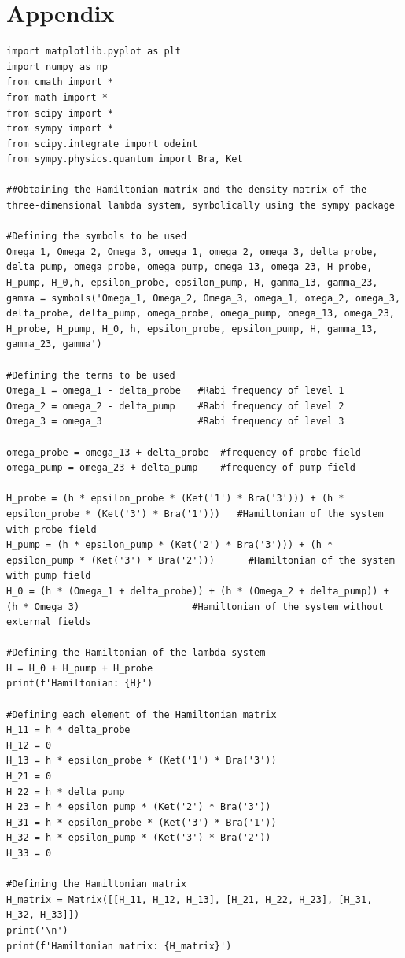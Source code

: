 \documentclass[12pt, a4paper]{article}
\begin{document}
\section{Appendix}
\begin{lstlisting}[language=iPython]
import matplotlib.pyplot as plt
import numpy as np
from cmath import *
from math import *
from scipy import *
from sympy import *
from scipy.integrate import odeint
from sympy.physics.quantum import Bra, Ket

##Obtaining the Hamiltonian matrix and the density matrix of the three-dimensional lambda system, symbolically using the sympy package

#Defining the symbols to be used
Omega_1, Omega_2, Omega_3, omega_1, omega_2, omega_3, delta_probe, delta_pump, omega_probe, omega_pump, omega_13, omega_23, H_probe, H_pump, H_0,h, epsilon_probe, epsilon_pump, H, gamma_13, gamma_23, gamma = symbols('Omega_1, Omega_2, Omega_3, omega_1, omega_2, omega_3, delta_probe, delta_pump, omega_probe, omega_pump, omega_13, omega_23, H_probe, H_pump, H_0, h, epsilon_probe, epsilon_pump, H, gamma_13, gamma_23, gamma')

#Defining the terms to be used
Omega_1 = omega_1 - delta_probe   #Rabi frequency of level 1
Omega_2 = omega_2 - delta_pump    #Rabi frequency of level 2
Omega_3 = omega_3                 #Rabi frequency of level 3

omega_probe = omega_13 + delta_probe  #frequency of probe field
omega_pump = omega_23 + delta_pump    #frequency of pump field

H_probe = (h * epsilon_probe * (Ket('1') * Bra('3'))) + (h * epsilon_probe * (Ket('3') * Bra('1')))   #Hamiltonian of the system with probe field
H_pump = (h * epsilon_pump * (Ket('2') * Bra('3'))) + (h * epsilon_pump * (Ket('3') * Bra('2')))      #Hamiltonian of the system with pump field
H_0 = (h * (Omega_1 + delta_probe)) + (h * (Omega_2 + delta_pump)) + (h * Omega_3)                    #Hamiltonian of the system without external fields

#Defining the Hamiltonian of the lambda system
H = H_0 + H_pump + H_probe
print(f'Hamiltonian: {H}')

#Defining each element of the Hamiltonian matrix
H_11 = h * delta_probe
H_12 = 0
H_13 = h * epsilon_probe * (Ket('1') * Bra('3'))
H_21 = 0
H_22 = h * delta_pump
H_23 = h * epsilon_pump * (Ket('2') * Bra('3'))
H_31 = h * epsilon_probe * (Ket('3') * Bra('1'))
H_32 = h * epsilon_pump * (Ket('3') * Bra('2'))
H_33 = 0

#Defining the Hamiltonian matrix
H_matrix = Matrix([[H_11, H_12, H_13], [H_21, H_22, H_23], [H_31, H_32, H_33]])
print('\n')
print(f'Hamiltonian matrix: {H_matrix}')


\end{lstlisting}
\end{document}
